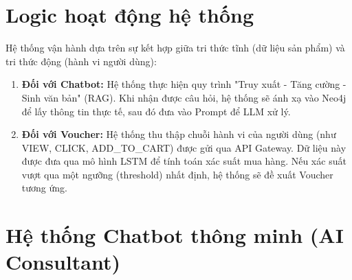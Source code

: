 \documentclass[12pt,a4paper]{report}
\begin{document}
\section{Logic hoạt động hệ thống}
Hệ thống vận hành dựa trên sự kết hợp giữa tri thức tĩnh (dữ liệu sản phẩm) và tri thức động (hành vi người dùng):
\begin{enumerate}
    \item \textbf{Đối với Chatbot:} Hệ thống thực hiện quy trình "Truy xuất - Tăng cường - Sinh văn bản" (RAG). Khi nhận được câu hỏi, hệ thống sẽ ánh xạ vào Neo4j để lấy thông tin thực tế, sau đó đưa vào Prompt để LLM xử lý.
    \item \textbf{Đối với Voucher:} Hệ thống thu thập chuỗi hành vi của người dùng (như VIEW, CLICK, ADD\_TO\_CART) được gửi qua API Gateway. Dữ liệu này được đưa qua mô hình LSTM để tính toán xác suất mua hàng. Nếu xác suất vượt qua một ngưỡng (threshold) nhất định, hệ thống sẽ đề xuất Voucher tương ứng.
\end{enumerate}

\section{Hệ thống Chatbot thông minh (AI Consultant)}
\end{document}

